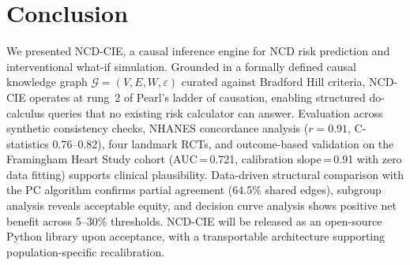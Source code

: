 \documentclass[runningheads]{llncs}
\begin{document}
\section{Conclusion}\label{sec:conclusion}

We presented NCD-CIE, a causal inference engine for NCD risk
prediction and interventional what-if simulation.  Grounded in a
formally defined causal knowledge graph
$\mathcal{G} = (V, E, W, \varepsilon)$ curated against Bradford Hill
criteria, NCD-CIE operates at rung~2 of Pearl's ladder of causation,
enabling structured do-calculus queries that no existing risk
calculator can answer.  Evaluation across synthetic consistency checks,
NHANES concordance analysis ($r = 0.91$, C-statistics 0.76--0.82),
four landmark RCTs, and outcome-based validation on the Framingham
Heart Study cohort (AUC\,=\,0.721, calibration slope\,=\,0.91 with zero data fitting) supports
clinical plausibility.  Data-driven
structural comparison with the PC algorithm confirms partial agreement
(64.5\% shared edges), subgroup analysis reveals acceptable equity,
and decision curve analysis shows positive net benefit across 5--30\%
thresholds.  NCD-CIE will be released as an open-source
Python library upon acceptance, with a transportable architecture
supporting population-specific recalibration.
\end{document}
